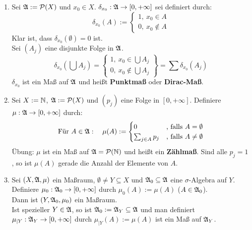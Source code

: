\begin{beispiel}
\begin{enumerate}
    \item Sei $\mathfrak{A}:=\mathcal{P}(X)$ und $x_0\in X$. 
          $\delta_{x_0}:\mathfrak{A}\to[0,+\infty]$ sei definiert durch:
          \[\delta_{x_0}(A):=
          \begin{cases}
          1,\ x_0\in A\\
          0,\ x_0\not\in A
          \end{cases}\]
          Klar ist, dass $\delta_{x_0}(\emptyset)=0$ ist.\\
          Sei $(A_j)$ eine disjunkte Folge in $\mathfrak{A}$.
          \[\delta_{x_0}(\bigcup A_j)=
          \left.\begin{cases}
          1,\ x_0\in\bigcup A_j\\
          0,\ x_0\not\in\bigcup A_j
          \end{cases}\right\}=\sum\delta_{x_0}(A_j)\]
          $\delta_{x_0}$ ist ein Maß auf $\mathfrak{A}$ und heißt 
          \textbf{Punktmaß} oder \textbf{Dirac-Maß}.
    \item Sei $X:=\mathbb{N}$, $\mathfrak{A}:=\mathcal{P}(X)$ und $(p_j)$ eine Folge in 
          $[0,+\infty]$. Definiere $\mu:\mathfrak{A}\to[0,+\infty]$ durch:
          \begin{align*}
          \text{Für } A \in \mathfrak{A}: \quad 
          \mu(A):=
          \begin{cases}
              0                &\text{, falls } A=\emptyset\\
              \sum_{j\in A}p_j &\text{, falls } A\ne\emptyset
          \end{cases}
          \end{align*}
          Übung: $\mu$ ist ein Maß auf $\mathfrak{A}=\mathcal{P}(\mathbb{N})$ und heißt ein \textbf{Zählmaß}. 
          Sind alle $p_j=1$, so ist $\mu(A)$ gerade die Anzahl der 
          Elemente von $A$.
    \item Sei $(X,\mathfrak{A},\mu)$ ein Maßraum, $\emptyset\ne Y\subseteq X$ 
          und $\mathfrak{A}_0\subseteq\mathfrak{A}$ eine $\sigma$-Algebra auf $Y$. 
          Definiere $\mu_0:\mathfrak{A}_0\to[0,+\infty]$ durch 
          $\mu_0(A):=\mu(A)$ ($A\in\mathfrak{A}_0$).\\
          Dann ist 
          $(Y,\mathfrak{A}_0,\mu_0)$ ein Maßraum.\\
          Ist spezieller $Y\in\mathfrak{A}$, so ist $\mathfrak{A}_0:=\mathfrak{A}_Y\subseteq\mathfrak{A}$ 
          und man definiert $\mu_{|Y}:\mathfrak{A}_Y\to[0,+\infty]$ durch 
          $\mu_{|Y}(A):=\mu(A)$ ist ein Maß auf $\mathfrak{A}_Y$.
\end{enumerate}
\end{beispiel}

